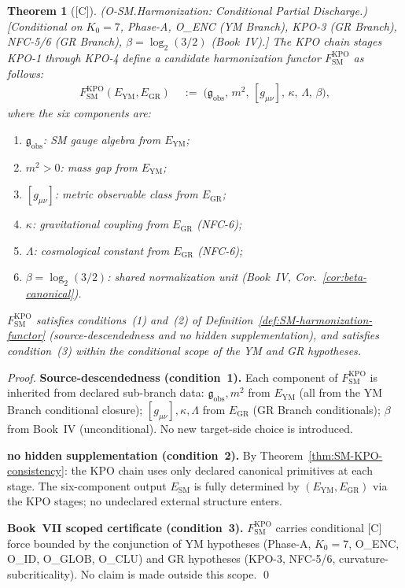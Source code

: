 \documentclass[12pt,oneside]{amsbook}
\theoremstyle{plain}
\newtheorem{theorem}{Theorem}[section]
\theoremstyle{definition}
\theoremstyle{remark}
\newcommand{\status}[1]{\textup{[#1]}}
\begin{document}
\begin{theorem}[\status{C}]\label{thm:SM-harmonization-partial}
\textup{(O-SM.Harmonization: Conditional Partial Discharge.)}
\textup{[Conditional on $K_0=7$, Phase-A, O\_ENC (YM Branch),
KPO-3 (GR Branch), NFC-5/6 (GR Branch), $\beta=\log_2(3/2)$
(Book~IV).]}
The KPO chain stages KPO-1 through KPO-4 define a candidate
harmonization functor $F_{\mathrm{SM}}^{\mathrm{KPO}}$ as
follows:
\begin{align*}
 F_{\mathrm{SM}}^{\mathrm{KPO}}(E_{\mathrm{YM}},E_{\mathrm{GR}})
 &\;:=\;
 \bigl(\mathfrak{g}_{\mathrm{obs}},\, m^2,\, [g_{\mu\nu}],\,
 \kappa,\, \Lambda,\, \beta\bigr),
\end{align*}
where the six components are:
\begin{enumerate}[label=\textup{(\arabic*)}]
 \item $\mathfrak{g}_{\mathrm{obs}}$: SM gauge algebra from $E_{\mathrm{YM}}$;
 \item $m^2 > 0$: mass gap from $E_{\mathrm{YM}}$;
 \item $[g_{\mu\nu}]$: metric observable class from $E_{\mathrm{GR}}$;
 \item $\kappa$: gravitational coupling from $E_{\mathrm{GR}}$ (NFC-6);
 \item $\Lambda$: cosmological constant from $E_{\mathrm{GR}}$ (NFC-6);
 \item $\beta = \log_2(3/2)$: shared normalization unit
 (Book~IV, Cor.~\ref{cor:beta-canonical}).
\end{enumerate}
$F_{\mathrm{SM}}^{\mathrm{KPO}}$ satisfies conditions~(1) and~(2)
of Definition~\ref{def:SM-harmonization-functor} (source-descendedness
and no hidden supplementation), and satisfies condition~(3) within
the conditional scope of the YM and GR hypotheses.
\end{theorem}

\begin{proof}
\textbf{Source-descendedness (condition~1).}
Each component of $F_{\mathrm{SM}}^{\mathrm{KPO}}$ is inherited
from declared sub-branch data:
$\mathfrak{g}_{\mathrm{obs}}, m^2$ from $E_{\mathrm{YM}}$ (all
from the YM Branch conditional closure);
$[g_{\mu\nu}], \kappa, \Lambda$ from $E_{\mathrm{GR}}$ (GR Branch
conditionals);
$\beta$ from Book~IV (unconditional).
No new target-side choice is introduced.

\textbf{no hidden supplementation (condition~2).}
By Theorem~\ref{thm:SM-KPO-consistency}: the KPO chain uses only
declared canonical primitives at each stage. The six-component
output $E_{\mathrm{SM}}$ is fully determined by
$(E_{\mathrm{YM}}, E_{\mathrm{GR}})$ via the KPO stages;
no undeclared external structure enters.

\textbf{Book~VII scoped certificate (condition~3).}
$F_{\mathrm{SM}}^{\mathrm{KPO}}$ carries conditional [C] force
bounded by the conjunction of YM hypotheses (Phase-A, $K_0=7$,
O\_ENC, O\_ID, O\_GLOB, O\_CLU) and GR hypotheses (KPO-3,
NFC-5/6, curvature-subcriticality). No claim is made outside
this scope. \qed
\end{proof}
\end{document}
